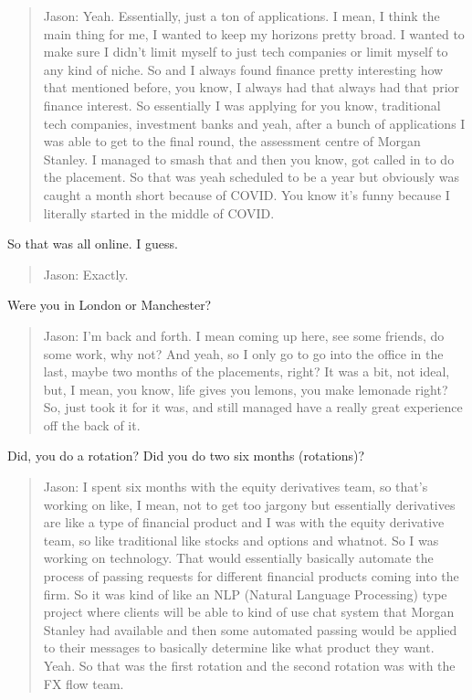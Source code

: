 \documentclass[
]{book}
\begin{document}
\begin{quote}
Jason: Yeah. Essentially, just a ton of applications. I mean, I think the main thing for me, I wanted to keep my horizons pretty broad. I wanted to make sure I didn't limit myself to just tech companies or limit myself to any kind of niche. So and I always found finance pretty interesting how that mentioned before, you know, I always had that always had that prior finance interest. So essentially I was applying for you know, traditional tech companies, investment banks and yeah, after a bunch of applications I was able to get to the final round, the assessment centre of Morgan Stanley. I managed to smash that and then you know, got called in to do the placement. So that was yeah scheduled to be a year but obviously was caught a month short because of COVID. You know it's funny because I literally started in the middle of COVID.
\end{quote}

So that was all online. I guess.

\begin{quote}
Jason: Exactly.
\end{quote}

Were you in London or Manchester?

\begin{quote}
Jason: I'm back and forth. I mean coming up here, see some friends, do some work, why not? And yeah, so I only go to go into the office in the last, maybe two months of the placements, right? It was a bit, not ideal, but, I mean, you know, life gives you lemons, you make lemonade right? So, just took it for it was, and still managed have a really great experience off the back of it.
\end{quote}

Did, you do a rotation? Did you do two six months (rotations)?

\begin{quote}
Jason: I spent six months with the equity derivatives team, so that's working on like, I mean, not to get too jargony but essentially derivatives are like a type of financial product and I was with the equity derivative team, so like traditional like stocks and options and whatnot. So I was working on technology. That would essentially basically automate the process of passing requests for different financial products coming into the firm. So it was kind of like an NLP (Natural Language Processing) type project where clients will be able to kind of use chat system that Morgan Stanley had available and then some automated passing would be applied to their messages to basically determine like what product they want. Yeah. So that was the first rotation and the second rotation was with the FX flow team.
\end{quote}
\end{document}
